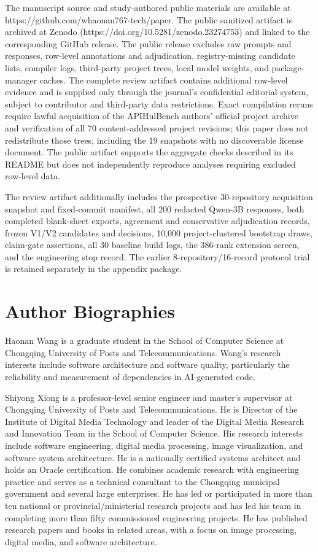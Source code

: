 \documentclass[pdflatex,sn-basic]{sn-jnl}
\begin{document}
The manuscript source and study-authored public materials are available at https://github.com/whaonan767-tech/paper. The public sanitized artifact is archived at Zenodo (https://doi.org/10.5281/zenodo.23274753) and linked to the corresponding GitHub release. The public release excludes raw prompts and responses, row-level annotations and adjudication, registry-missing candidate lists, compiler logs, third-party project trees, local model weights, and package-manager caches. The complete review artifact contains additional row-level evidence and is supplied only through the journal's confidential editorial system, subject to contributor and third-party data restrictions. Exact compilation reruns require lawful acquisition of the APIHulBench authors' official project archive and verification of all 70 content-addressed project revisions; this paper does not redistribute those trees, including the 19 snapshots with no discoverable license document. The public artifact supports the aggregate checks described in its README but does not independently reproduce analyses requiring excluded row-level data.

The review artifact additionally includes the prospective 30-repository acquisition snapshot and fixed-commit manifest, all 200 redacted Qwen-3B responses, both completed blank-sheet exports, agreement and conservative adjudication records, frozen V1/V2 candidates and decisions, 10,000 project-clustered bootstrap draws, claim-gate assertions, all 30 baseline build logs, the 386-rank extension screen, and the engineering stop record. The earlier 8-repository/16-record protocol trial is retained separately in the appendix package.

\section*{Author Biographies}

Haonan Wang is a graduate student in the School of Computer Science at Chongqing University of Posts and Telecommunications. Wang's research interests include software architecture and software quality, particularly the reliability and measurement of dependencies in AI-generated code.

Shiyong Xiong is a professor-level senior engineer and master's supervisor at Chongqing University of Posts and Telecommunications. He is Director of the Institute of Digital Media Technology and leader of the Digital Media Research and Innovation Team in the School of Computer Science. His research interests include software engineering, digital media processing, image visualization, and software system architecture. He is a nationally certified systems architect and holds an Oracle certification. He combines academic research with engineering practice and serves as a technical consultant to the Chongqing municipal government and several large enterprises. He has led or participated in more than ten national or provincial/ministerial research projects and has led his team in completing more than fifty commissioned engineering projects. He has published research papers and books in related areas, with a focus on image processing, digital media, and software architecture.
\end{document}
